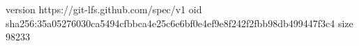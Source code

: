 version https://git-lfs.github.com/spec/v1
oid sha256:35a05276030ca5494cfbbca4e25c6e6bf0e4ef9e8f242f2fbb98db499447f3c4
size 98233
